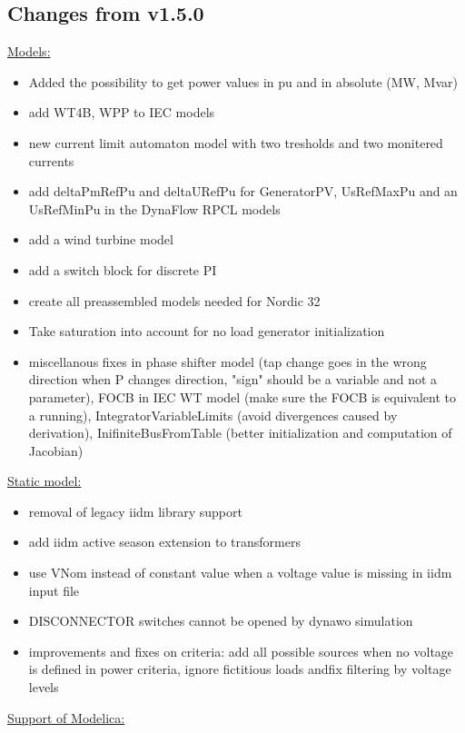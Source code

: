 \documentclass[a4paper, 12pt]{report}
\begin{document}
\subsection{Changes from v1.5.0}

\underline{Models:}

\begin{itemize}
\item Added the possibility to get power values in pu and in absolute (MW, Mvar)
\item add WT4B, WPP to IEC models
\item new current limit automaton model with two tresholds and two monitered currents
\item add deltaPmRefPu and deltaURefPu for GeneratorPV, UsRefMaxPu and an UsRefMinPu in the DynaFlow RPCL models
\item add a wind turbine model
\item add a switch block for discrete PI
\item create all preassembled models needed for Nordic 32
\item Take saturation into account for no load generator initialization
\item miscellanous fixes in phase shifter model (tap change goes in the wrong direction when P changes direction, "sign" should be a variable and not a parameter), FOCB in IEC WT model (make sure the FOCB is equivalent to a running), IntegratorVariableLimits (avoid divergences caused by derivation), InifiniteBusFromTable (better initialization and computation of Jacobian)
\end{itemize}

\underline{Static model:}

\begin{itemize}
\item removal of legacy iidm library support
\item add iidm active season extension to transformers
\item use VNom instead of constant value when a voltage value is missing in iidm input file
\item DISCONNECTOR switches cannot be opened by dynawo simulation
\item improvements and fixes on criteria: add all possible sources when no voltage is defined in power criteria, ignore fictitious loads andfix filtering by voltage levels
\end{itemize}

\underline{Support of Modelica:}
\end{document}
